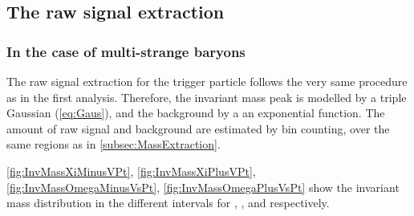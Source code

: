 \subsection{The raw signal extraction}
\label{subsec:CascadeResonanceSignalExtraction}

\subsubsection{In the case of multi-strange baryons}

The raw signal extraction for the trigger particle follows the very same procedure as in the first analysis. Therefore, the invariant mass peak is modelled by a triple Gaussian (\eq\ref{eq:Gaus}), and the background by a an exponential function. The amount of raw signal and background are estimated by bin counting, over the same regions as in \Sec\ref{subsec:MassExtraction}. 

\Figs\ref{fig:InvMassXiMinusVPt}, \ref{fig:InvMassXiPlusVPt}, \ref{fig:InvMassOmegaMinusVsPt}, \ref{fig:InvMassOmegaPlusVsPt} show the invariant mass distribution in the different \pT intervals for \rmXiM, \rmAxiP, \rmOmegaM and \rmAomegaP respectively.

